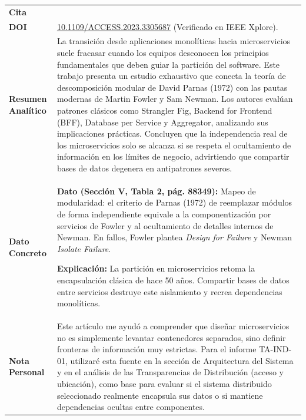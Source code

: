 \documentclass[11pt,a4paper]{article}
\begin{document}
\noindent
\renewcommand{\arraystretch}{1.2}
\begin{tabularx}{\textwidth}{|>{\raggedright\arraybackslash}p{3.2cm}|X|}
\hline
\multicolumn{2}{|c|}{\bfseries FICHA DE LECTURA N.° 1: PRINCIPIOS Y PATRONES} \\
\hline
\textbf{Cita} & \parbox{\dimexpr\linewidth-6pt\relax}{\raggedright\vspace{2pt}\vspace{2pt}} \\
\hline
\textbf{DOI} & \href{https://doi.org/10.1109/ACCESS.2023.3305687}{10.1109/ACCESS.2023.3305687} (Verificado en IEEE Xplore). \\
\hline
\textbf{Resumen Analítico} & La transición desde aplicaciones monolíticas hacia microservicios suele fracasar cuando los equipos desconocen los principios fundamentales que deben guiar la partición del software. Este trabajo presenta un estudio exhaustivo que conecta la teoría de descomposición modular de David Parnas (1972) con las pautas modernas de Martin Fowler y Sam Newman. Los autores evalúan patrones clásicos como Strangler Fig, Backend for Frontend (BFF), Database per Service y Aggregator, analizando sus implicaciones prácticas. Concluyen que la independencia real de los microservicios solo se alcanza si se respeta el ocultamiento de información en los límites de negocio, advirtiendo que compartir bases de datos degenera en antipatrones severos. \\
\hline
\textbf{Dato Concreto} & \textbf{Dato (Sección V, Tabla 2, pág. 88349):} Mapeo de modularidad: el criterio de Parnas (1972) de reemplazar módulos de forma independiente equivale a la componentización por servicios de Fowler y al ocultamiento de detalles internos de Newman. En fallos, Fowler plantea \emph{Design for Failure} y Newman \emph{Isolate Failure}. \par\vspace{0.2em}
\textbf{Explicación:} La partición en microservicios retoma la encapsulación clásica de hace 50 años. Compartir bases de datos entre servicios destruye este aislamiento y recrea dependencias monolíticas. \\
\hline
\textbf{Nota Personal} & Este artículo me ayudó a comprender que diseñar microservicios no es simplemente levantar contenedores separados, sino definir fronteras de información muy estrictas. Para el informe TA-IND-01, utilizaré esta fuente en la sección de Arquitectura del Sistema y en el análisis de las Transparencias de Distribución (acceso y ubicación), como base para evaluar si el sistema distribuido seleccionado realmente encapsula sus datos o si mantiene dependencias ocultas entre componentes. \\
\hline
\end{tabularx}
\end{document}
